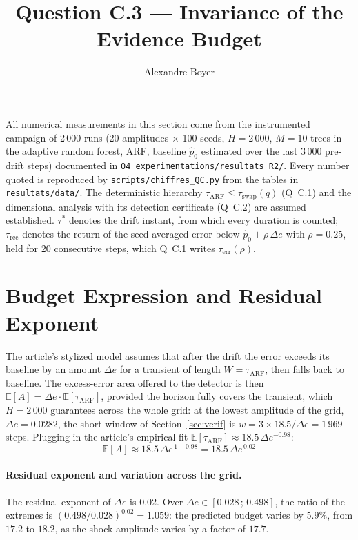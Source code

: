 \documentclass[11pt,a4paper]{article}
\title{Question C.3 --- Invariance of the Evidence Budget}
\author{Alexandre Boyer}
\date{}
\begin{document}
\maketitle

\noindent All numerical measurements in this section come from the instrumented
campaign of 2\,000 runs (20 amplitudes $\times$ 100 seeds, $H=2\,000$, $M = 10$ trees in
the adaptive random forest, ARF, baseline $\hat p_0$ estimated over the last 3\,000
pre-drift steps) documented in \texttt{04\_experimentations/resultats\_R2/}. Every number
quoted is reproduced by \texttt{scripts/chiffres\_QC.py} from the tables in
\texttt{resultats/data/}. The deterministic hierarchy
$\tau_{\mathrm{ARF}} \le \tau_{\mathrm{swap}}(q)$ (Q~C.1) and the dimensional analysis
with its detection certificate (Q~C.2) are assumed established. $\tau^*$ denotes the
drift instant, from which every duration is counted; $\tau_{\mathrm{rec}}$ denotes the
return of the seed-averaged error below $\hat p_0 + \rho\,\Delta e$ with $\rho = 0.25$,
held for $20$ consecutive steps, which Q~C.1 writes $\tau_{\mathrm{err}}(\rho)$.

\section{Budget Expression and Residual Exponent}

The article's stylized model assumes that after the drift the error exceeds its
baseline by an amount $\Delta e$ for a transient of length $W = \tau_{\mathrm{ARF}}$,
then falls back to baseline. The excess-error area offered to the detector is then
$\mathbb{E}[A] = \Delta e \cdot \mathbb{E}[\tau_{\mathrm{ARF}}]$, provided the horizon
fully covers the transient, which $H = 2\,000$ guarantees across the whole grid: at
the lowest amplitude of the grid, $\Delta e = 0.0282$, the short window of
Section~\ref{sec:verif} is $w = 3 \times 18.5/\Delta e = 1\,969$ steps. Plugging in the
article's empirical fit
$\mathbb{E}[\tau_{\mathrm{ARF}}] \approx 18.5\,\Delta e^{-0.98}$:
\begin{equation}
  \boxed{\mathbb{E}[A] \approx 18.5\,\Delta e^{\,1-0.98} = 18.5\,\Delta e^{\,0.02}}
  \label{eq:budget}
\end{equation}

\paragraph{Residual exponent and variation across the grid.} The residual exponent of
$\Delta e$ is $0.02$. Over $\Delta e \in [0.028\,;\,0.498]$, the ratio of the extremes
is $(0.498/0.028)^{0.02} = 1.059$: the predicted budget varies by $5.9\%$, from
$17.2$ to $18.2$, as the shock amplitude varies by a factor of $17.7$.
\end{document}
